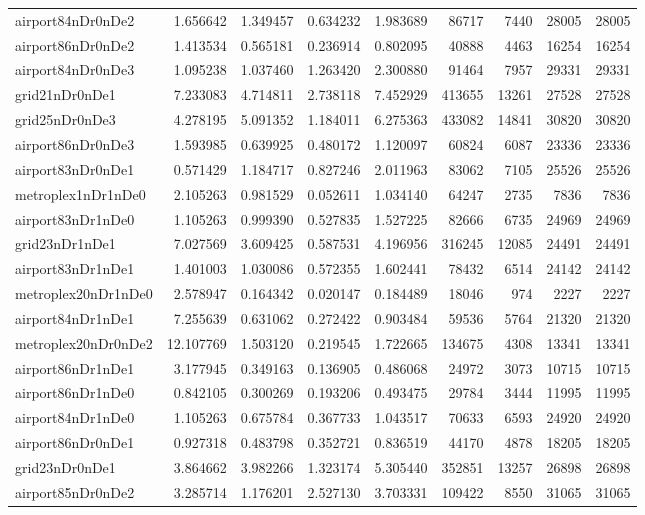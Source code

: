 \begin{longtable}{|l|r|r|r|r|r|r|r|r|}
airport84nDr0nDe2 & 1.656642 & 1.349457 & 0.634232 & 1.983689 & 86717 & 7440 & 28005 & 28005 \\
airport86nDr0nDe2 & 1.413534 & 0.565181 & 0.236914 & 0.802095 & 40888 & 4463 & 16254 & 16254 \\
airport84nDr0nDe3 & 1.095238 & 1.037460 & 1.263420 & 2.300880 & 91464 & 7957 & 29331 & 29331 \\
grid21nDr0nDe1 & 7.233083 & 4.714811 & 2.738118 & 7.452929 & 413655 & 13261 & 27528 & 27528 \\
grid25nDr0nDe3 & 4.278195 & 5.091352 & 1.184011 & 6.275363 & 433082 & 14841 & 30820 & 30820 \\
airport86nDr0nDe3 & 1.593985 & 0.639925 & 0.480172 & 1.120097 & 60824 & 6087 & 23336 & 23336 \\
airport83nDr0nDe1 & 0.571429 & 1.184717 & 0.827246 & 2.011963 & 83062 & 7105 & 25526 & 25526 \\
metroplex1nDr1nDe0 & 2.105263 & 0.981529 & 0.052611 & 1.034140 & 64247 & 2735 & 7836 & 7836 \\
airport83nDr1nDe0 & 1.105263 & 0.999390 & 0.527835 & 1.527225 & 82666 & 6735 & 24969 & 24969 \\
grid23nDr1nDe1 & 7.027569 & 3.609425 & 0.587531 & 4.196956 & 316245 & 12085 & 24491 & 24491 \\
airport83nDr1nDe1 & 1.401003 & 1.030086 & 0.572355 & 1.602441 & 78432 & 6514 & 24142 & 24142 \\
metroplex20nDr1nDe0 & 2.578947 & 0.164342 & 0.020147 & 0.184489 & 18046 & 974 & 2227 & 2227 \\
airport84nDr1nDe1 & 7.255639 & 0.631062 & 0.272422 & 0.903484 & 59536 & 5764 & 21320 & 21320 \\
metroplex20nDr0nDe2 & 12.107769 & 1.503120 & 0.219545 & 1.722665 & 134675 & 4308 & 13341 & 13341 \\
airport86nDr1nDe1 & 3.177945 & 0.349163 & 0.136905 & 0.486068 & 24972 & 3073 & 10715 & 10715 \\
airport86nDr1nDe0 & 0.842105 & 0.300269 & 0.193206 & 0.493475 & 29784 & 3444 & 11995 & 11995 \\
airport84nDr1nDe0 & 1.105263 & 0.675784 & 0.367733 & 1.043517 & 70633 & 6593 & 24920 & 24920 \\
airport86nDr0nDe1 & 0.927318 & 0.483798 & 0.352721 & 0.836519 & 44170 & 4878 & 18205 & 18205 \\
grid23nDr0nDe1 & 3.864662 & 3.982266 & 1.323174 & 5.305440 & 352851 & 13257 & 26898 & 26898 \\
airport85nDr0nDe2 & 3.285714 & 1.176201 & 2.527130 & 3.703331 & 109422 & 8550 & 31065 & 31065 \\

\end{longtable}
